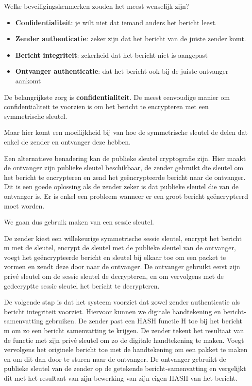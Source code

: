 Welke beveiligingskenmerken zouden het meest wenselijk zijn?

\begin{itemize}
\item \textbf{Confidentialiteit}: je wilt niet dat iemand anders het bericht leest.
\item \textbf{Zender authenticatie}: zeker zijn dat het bericht van de juiste zender komt.
\item \textbf{Bericht integriteit}: zekerheid dat het bericht niet is aangepast
\item \textbf{Ontvanger authenticatie}: dat het bericht ook bij de juiste ontvanger aankomt
\end{itemize}

\noindent De belangrijkste zorg is \textbf{confidentialiteit}. De meest eenvoudige manier om confidentialiteit te voorzien is om het bericht te encrypteren met een symmetrische sleutel. 

\noindent Maar hier komt een moeilijkheid bij van hoe de symmetrische sleutel de delen dat enkel de zender en ontvanger deze hebben. 

\noindent Een alternatieve benadering kan de publieke sleutel cryptografie zijn. Hier maakt de ontvanger zijn publieke sleutel beschikbaar, de zender gebruikt die sleutel om het bericht te encrypteren en zend het geëncrypteerde bericht naar de ontvanger. Dit is een goede oplossing als de zender zeker is dat publieke sleutel die van de ontvanger is. Er is enkel een probleem wanneer er een groot bericht geëncrypteerd moet worden.

\noindent We gaan dus gebruik maken van een sessie sleutel. 

\noindent De zender kiest een willekeurige symmetrische sessie sleutel, encrypt het bericht m met de sleutel, encrypt de sleutel met de publieke sleutel van de ontvanger, voegt het geëncrypteerde bericht en sleutel bij elkaar toe om een packet te vormen en zendt deze door naar de ontvanger. De ontvanger gebruikt eerst zijn privé sleutel om de sessie sleutel de decrypteren, en om vervolgens met de gedecryptte sessie sleutel het bericht te decrypteren.

\noindent De volgende stap is dat het systeem voorziet dat zowel zender authenticatie als bericht integriteit voorziet. Hiervoor kunnen we digitale handtekening en bericht-samenvatting gebruiken. De zender past een HASH functie H toe bij het bericht m om zo een bericht samenvatting te krijgen. De zender tekent het resultaat van de functie met zijn privé sleutel om zo de digitale handtekening te maken. Voegt vervolgens het originele bericht toe met de handtekening om een pakket te maken en om dit dan door te sturen naar de ontvanger. De ontvanger gebruikt de publieke sleutel van de zender op de getekende bericht-samenvatting en vergelijkt dit met het resultaat van zijn bewerking van zijn eigen HASH van het bericht.


